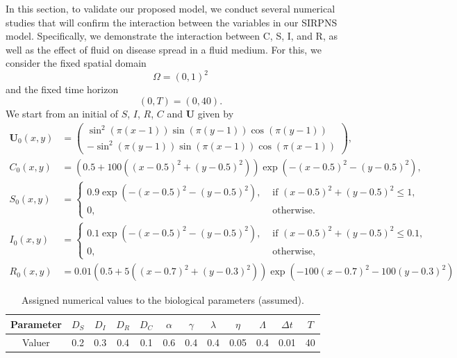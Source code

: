 \documentclass[10pt,number,preprint,times]{elsarticle}
\numberwithin{equation}{section} %
\begin{document}
	In this section, to validate our proposed model, we conduct several numerical studies that will confirm the interaction between the variables in our SIRPNS model. Specifically, we demonstrate the interaction between C, S, I, and R, as well as the effect of fluid on disease spread in a fluid medium. For this, we consider the fixed spatial domain
	$$\Omega = (0, 1)^2$$
	and the fixed time horizon
	$$(0, T) = (0, 40).$$
		We start from an initial of $S$, $I$, $R$, $C$ and $\boldsymbol{U}$ given by
	$$
	\begin{aligned}
		\boldsymbol{U}_0(x,y)&=\begin{pmatrix}
			\sin^2(\pi (x-1))\sin(\pi (y-1))\cos(\pi (y-1)) \\
			-\sin^2(\pi (y-1))\sin(\pi (x-1))\cos(\pi (x-1))
		\end{pmatrix},\\
		C_0(x, y)&=(0.5+100((x-0.5)^2+(y-0.5)^2))\exp(-(x-0.5)^2-(y-0.5)^2),\\
		S_0(x, y)&=
		\begin{cases}0.9 \exp \left(-(x-0.5)^2-(y-0.5)^2\right), & \text { if }(x-0.5)^2 + (y-0.5)^2  \leq 1, \\ 0, & \text { otherwise.}\end{cases}
		\\%
		I_0(x, y)&=
		\begin{cases}0.1 \exp \left(-(x-0.5)^2-(y-0.5)^2\right), & \text { if }(x-0.5)^2 + (y-0.5)^2  \leq 0.1, \\ 0, & \text { otherwise, }\end{cases}\\
		R_0(x, y)&=0.01(0.5+5((x-0.7)^2+(y-0.3)^2))\exp(-100(x-0.7)^2-100(y-0.3)^2)
	\end{aligned}
	$$
	\begin{table}[!ht]
		\centering
		\begin{tabular}{|c|c|c|c|c|c|c|c|c|c|c|c|}%
			\hline
			Parameter & $D_S$ & $D_I$ & $D_R$ & $D_C$ & $\alpha$ & $\gamma$ & $\lambda$ & $\eta$ & $\Lambda$ & $\Delta t$ & $T$ \\
			\hline
			Valuer  & 0.2 & 0.3 & 0.4 & 0.1 & 0.6 & 0.4 & 0.4  & 0.05 &0.4 & 0.01 & 40 \\
			\hline
		\end{tabular}
		\caption{Assigned numerical values to the biological parameters (assumed).}
	\end{table}
	
\end{document}
